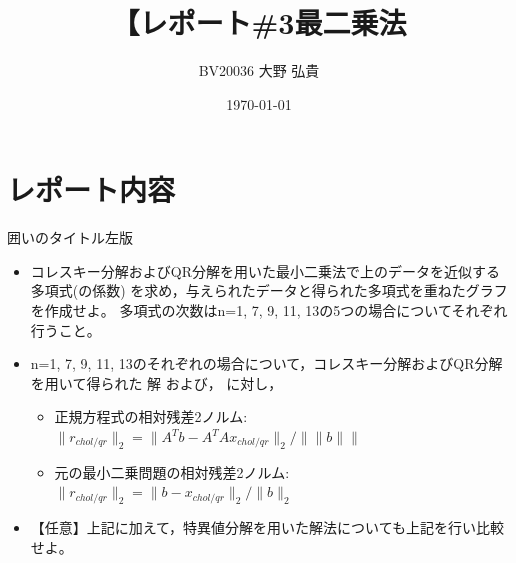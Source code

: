 \documentclass[titlepage, a4paper, 11pt, dvipdfmx]{jsarticle}
\title{\Huge【レポート\#3最二乗法}
\date{\today}%
\author{\Large BV20036 \quad 大野 弘貴}%
\begin{document}
\maketitle
{}
\newpage
{}


\section{レポート内容}
\begin{itembox}[l]{囲いのタイトル左版}


 

    \begin{itemize}
        \item コレスキー分解およびQR分解を用いた最小二乗法で上のデータを近似する多項式(の係数) を求め，与えられたデータと得られた多項式を重ねたグラフを作成せよ。 多項式の次数はn=1, 7, 9, 11, 13の5つの場合についてそれぞれ行うこと。
        \item n=1, 7, 9, 11, 13のそれぞれの場合について，コレスキー分解およびQR分解を用いて得られた 解 および， に対し，
        \begin{itemize}
            \item 正規方程式の相対残差2ノルム: $ \| r_{chol/qr} \|_2 = \| A^T b - A^T Ax_{chol/qr} \|_2 / \|\| b \|\| $ 
            \item 元の最小二乗問題の相対残差2ノルム:$ \| r_{chol/qr} \|_2 = \| b - x_{chol/qr} \|_2 / \| b \|_2 $ 
        \end{itemize} 
        \item 【任意】上記に加えて，特異値分解を用いた解法についても上記を行い比較せよ。
  \end{itemize}
\end{itembox}
\end{document}
